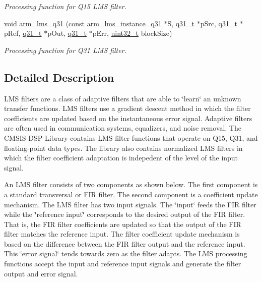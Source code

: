 \begin{DoxyCompactItemize}
\begin{DoxyCompactList}\small\item\em Processing function for Q15 L\-M\-S filter. \end{DoxyCompactList}\item 
\hyperlink{group___n_a_m_e_ga18028b8badbf1ea7e704ccac3c488e82}{void} \hyperlink{group___l_m_s_ga6a0abfe6041253a6f91c63b383a64257}{arm\-\_\-lms\-\_\-q31} (\hyperlink{group___n_a_m_e_ga7ae6d0e43244213b34de2c2b9aa30da6}{const} \hyperlink{structarm__lms__instance__q31}{arm\-\_\-lms\-\_\-instance\-\_\-q31} $\ast$S, \hyperlink{arm__math_8h_adc89a3547f5324b7b3b95adec3806bc0}{q31\-\_\-t} $\ast$p\-Src, \hyperlink{arm__math_8h_adc89a3547f5324b7b3b95adec3806bc0}{q31\-\_\-t} $\ast$p\-Ref, \hyperlink{arm__math_8h_adc89a3547f5324b7b3b95adec3806bc0}{q31\-\_\-t} $\ast$p\-Out, \hyperlink{arm__math_8h_adc89a3547f5324b7b3b95adec3806bc0}{q31\-\_\-t} $\ast$p\-Err, \hyperlink{stdint_8h_a435d1572bf3f880d55459d9805097f62}{uint32\-\_\-t} block\-Size)
\begin{DoxyCompactList}\small\item\em Processing function for Q31 L\-M\-S filter. \end{DoxyCompactList}\end{DoxyCompactItemize}


\subsection{Detailed Description}
L\-M\-S filters are a class of adaptive filters that are able to \char`\"{}learn\char`\"{} an unknown transfer functions. L\-M\-S filters use a gradient descent method in which the filter coefficients are updated based on the instantaneous error signal. Adaptive filters are often used in communication systems, equalizers, and noise removal. The C\-M\-S\-I\-S D\-S\-P Library contains L\-M\-S filter functions that operate on Q15, Q31, and floating-\/point data types. The library also contains normalized L\-M\-S filters in which the filter coefficient adaptation is indepedent of the level of the input signal.

An L\-M\-S filter consists of two components as shown below. The first component is a standard transversal or F\-I\-R filter. The second component is a coefficient update mechanism. The L\-M\-S filter has two input signals. The \char`\"{}input\char`\"{} feeds the F\-I\-R filter while the \char`\"{}reference input\char`\"{} corresponds to the desired output of the F\-I\-R filter. That is, the F\-I\-R filter coefficients are updated so that the output of the F\-I\-R filter matches the reference input. The filter coefficient update mechanism is based on the difference between the F\-I\-R filter output and the reference input. This \char`\"{}error signal\char`\"{} tends towards zero as the filter adapts. The L\-M\-S processing functions accept the input and reference input signals and generate the filter output and error signal. 

